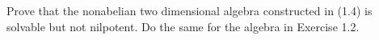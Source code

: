 Prove that the nonabelian two dimensional algebra constructed in (1.4) is solvable but not nilpotent. Do the same for the algebra in Exercise 1.2.
